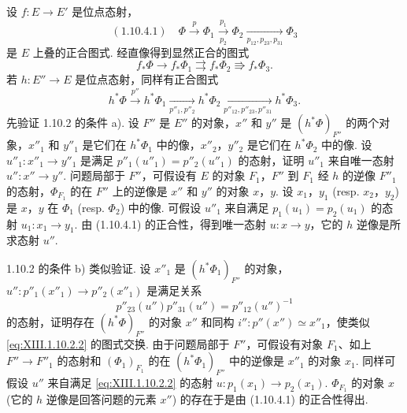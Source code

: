 设 $f \colon E \to E'$ 是位点态射，
\[
(1.10.4.1) \quad \Phi \xrightarrow{p} \Phi_1 \xrightarrow[p_2]{p_1} \Phi_2 \xrightarrow[p_{12}, p_{23}, p_{31}]{} \Phi_3
\]
是 $E$ 上叠的正合图式. 经直像得到显然正合的图式
\[
f_* \Phi \longrightarrow f_* \Phi_1 \rightrightarrows f_* \Phi_2 \Rrightarrow f_* \Phi_3.
\]
若 $h \colon E'' \to E$ 是位点态射，同样有正合图式
\[
h^{*} \Phi \xrightarrow{p''} h^{*} \Phi_1 \xrightarrow[p''_1, p''_2]{} h^{*} \Phi_2 \xrightarrow[p''_{12}, p''_{23}, p''_{31}]{} h^{*} \Phi_3.
\]
先验证 1.10.2 的条件 a). 设 $F''$ 是 $E''$ 的对象，$x''$ 和 $y''$ 是 $(h^{*} \Phi)_{F''}$ 的两个对象，$x''_1$ 和 $y''_1$ 是它们在 $h^{*} \Phi_1$ 中的像，$x''_2$，$y''_2$ 是它们在 $h^{*} \Phi_2$ 中的像. 设 $u''_1 \colon x''_1 \to y''_1$ 是满足 $p''_1(u''_1) = p''_2(u''_1)$ 的态射，证明 $u''_1$ 来自唯一态射 $u'' \colon x'' \to y''$. 问题局部于 $F''$，可假设有 $E$ 的对象 $F_1$，$F''$ 到 $F_1$ 经 $h$ 的逆像 $F''_1$ 的态射，$\Phi_{F_1}$ 的在 $F''$ 上的逆像是 $x''$ 和 $y''$ 的对象 $x$，$y$. 设 $x_1$，$y_1$ (resp. $x_2$，$y_2$) 是 $x$，$y$ 在 $\Phi_1$ (resp. $\Phi_2$) 中的像. 可假设 $u''_1$ 来自满足 $p_1(u_1) = p_2(u_1)$ 的态射 $u_1 \colon x_1 \to y_1$. 由 (1.10.4.1) 的正合性，得到唯一态射 $u \colon x \to y$，它的 $h$ 逆像是所求态射 $u''$.

1.10.2 的条件 b) 类似验证. 设 $x''_1$ 是 $(h^{*} \Phi_1)_{F''}$ 的对象，$u'' \colon p''_1(x''_1) \to p''_2(x''_1)$ 是满足关系
\[
p''_{23}(u'') p''_{31}(u'') = p''_{12}(u'')^{-1}
\]
的态射，证明存在 $(h^{*} \Phi)_{F''}$ 的对象 $x''$ 和同构 $i'' \colon p''(x'') \simeq x''_1$，使类似 \eqref{eq:XIII.1.10.2.2} 的图式交换. 由于问题局部于 $F''$，可假设有对象 $F_1$、如上 $F'' \to F''_1$ 的态射和 $(\Phi_1)_{F_1}$ 的在 $(h^{*} \Phi_1)_{F''}$ 中的逆像是 $x''_1$ 的对象 $x_1$. 同样可假设 $u''$ 来自满足 \eqref{eq:XIII.1.10.2.2} 的态射 $u \colon p_1(x_1) \to p_2(x_1)$. $\Phi_{F_1}$ 的对象 $x$ (它的 $h$ 逆像是回答问题的元素 $x''$) 的存在于是由 (1.10.4.1) 的正合性得出.

